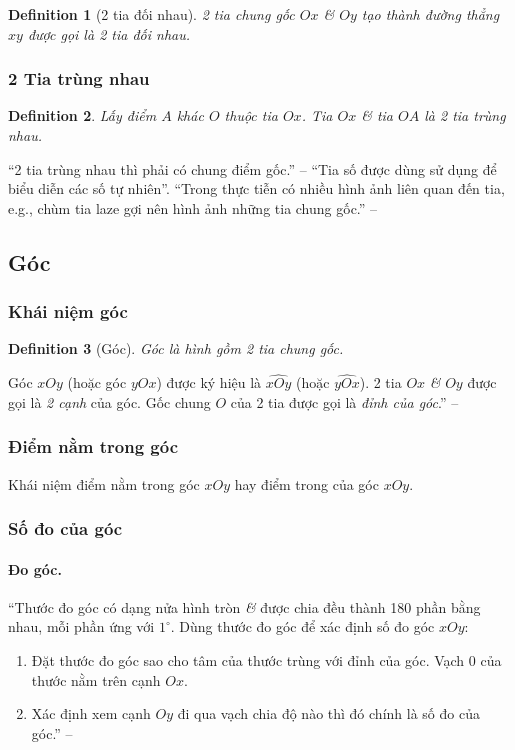 \documentclass{article}
\numberwithin{equation}{section}
\newtheorem{definition}{Definition}[section]
\begin{document}
\begin{definition}[2 tia đối nhau]
	2 tia chung gốc $Ox$ \textit{\&} $Oy$ tạo thành đường thẳng $xy$ được gọi là \emph{2 tia đối nhau}.
\end{definition}

\subsubsection{2 Tia trùng nhau}

\begin{definition}
	Lấy điểm $A$ khác $O$ thuộc tia $Ox$. Tia $Ox$ \textit{\&} tia $OA$ là \emph{2 tia trùng nhau}.
\end{definition}
``2 tia trùng nhau thì phải có chung điểm gốc.'' -- \cite[p. 91]{Thai_Anh_Dat_Ha_Loan_Nam_Quang_Toan_6_tap_2} ``Tia số được dùng sử dụng để biểu diễn các số tự nhiên''. ``Trong thực tiễn có nhiều hình ảnh liên quan đến tia, e.g., chùm tia laze gợi nên hình ảnh những tia chung gốc.'' -- \cite[p. 93]{Thai_Anh_Dat_Ha_Loan_Nam_Quang_Toan_6_tap_2}

\subsection{Góc}

\subsubsection{Khái niệm góc}

\begin{definition}[Góc]
	\emph{Góc} là hình gồm 2 tia chung gốc.
\end{definition}
Góc $xOy$  (hoặc góc $yOx$) được ký hiệu là $\widehat{xOy}$ (hoặc $\widehat{yOx}$). 2 tia $Ox$ \textit{\&} $Oy$ được gọi là \textit{2 cạnh} của góc. Gốc chung $O$ của 2 tia được gọi là \textit{đỉnh của góc}.'' -- \cite[p. 94]{Thai_Anh_Dat_Ha_Loan_Nam_Quang_Toan_6_tap_2}

\subsubsection{Điểm nằm trong góc}
Khái niệm điểm nằm trong góc $xOy$ hay điểm trong của góc $xOy$.

\subsubsection{Số đo của góc}

\paragraph{Đo góc.} ``Thước đo góc có dạng nửa hình tròn \textit{\&} được chia đều thành 180 phần bằng nhau, mỗi phần ứng với $1^\circ$. Dùng thước đo góc để xác định số đo góc $xOy$:
\begin{enumerate}
	\item Đặt thước đo góc sao cho tâm của thước trùng với đỉnh của góc. Vạch 0 của thước nằm trên cạnh $Ox$.
	\item Xác định xem cạnh $Oy$ đi qua vạch chia độ nào thì đó chính là số đo của góc.'' -- \cite[p. 96]{Thai_Anh_Dat_Ha_Loan_Nam_Quang_Toan_6_tap_2}
\end{enumerate}
\end{document}
